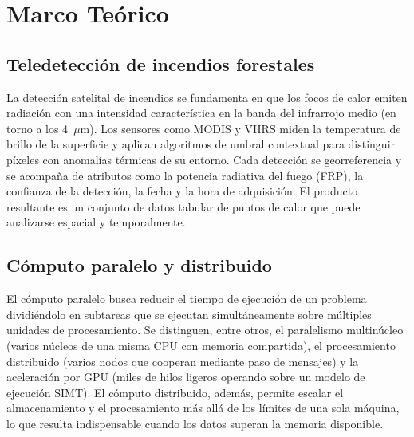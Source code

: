 \section{Marco Teórico}
\label{sec:marco}

\subsection{Teledetección de incendios forestales}
La detección satelital de incendios se fundamenta en que los focos de calor emiten radiación con una intensidad característica en la banda del infrarrojo medio (en torno a los 4~$\mu$m). Los sensores como MODIS y VIIRS miden la temperatura de brillo de la superficie y aplican algoritmos de umbral contextual para distinguir píxeles con anomalías térmicas de su entorno. Cada detección se georreferencia y se acompaña de atributos como la potencia radiativa del fuego (FRP), la confianza de la detección, la fecha y la hora de adquisición. El producto resultante es un conjunto de datos tabular de puntos de calor que puede analizarse espacial y temporalmente.

\subsection{Cómputo paralelo y distribuido}
El cómputo paralelo busca reducir el tiempo de ejecución de un problema dividiéndolo en subtareas que se ejecutan simultáneamente sobre múltiples unidades de procesamiento. Se distinguen, entre otros, el paralelismo multinúcleo (varios núcleos de una misma CPU con memoria compartida), el procesamiento distribuido (varios nodos que cooperan mediante paso de mensajes) y la aceleración por GPU (miles de hilos ligeros operando sobre un modelo de ejecución SIMT). El cómputo distribuido, además, permite escalar el almacenamiento y el procesamiento más allá de los límites de una sola máquina, lo que resulta indispensable cuando los datos superan la memoria disponible.

